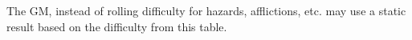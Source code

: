 

The GM, instead of rolling difficulty for hazards, afflictions, etc. may use a static result based on the difficulty from this table.


